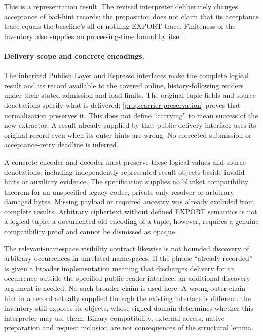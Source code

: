 This is a representation result. The revised interpreter deliberately
changes acceptance of bad-hint records; the proposition does not claim
that its acceptance trace equals the baseline's all-or-nothing EXPORT
trace. Finiteness of the inventory also supplies no processing-time
bound by itself.

\paragraph{Delivery scope and concrete encodings.}
The inherited Publish Layer and Espresso interfaces make the complete
logical result and its record available to the covered online,
history-following readers under their stated admission and load limits.
The original tuple fields and source denotations specify what is
delivered; \cref{prop:carrier-preservation} proves that normalization
preserves it. This does not define ``carrying'' to mean success of the
new extractor. A result already supplied by that public delivery
interface uses its original record even when its outer hints are
wrong. No corrected submission or acceptance-retry deadline is inferred.

A concrete encoder and decoder must preserve these logical values and
source denotations, including independently represented result objects
beside invalid hints or auxiliary evidence. The specification supplies
no blanket compatibility theorem for an unspecified legacy codec,
private-only resolver or arbitrary damaged bytes. Missing payload or
required ancestry was already excluded from complete results. Arbitrary
ciphertext without defined EXPORT semantics is not a logical tuple;
a documented old encoding of a tuple, however, requires a genuine
compatibility proof and cannot be dismissed as opaque.

The relevant-namespace visibility contract likewise is not bounded
discovery of arbitrary occurrences in unrelated namespaces. If the
phrase ``already recorded'' is given a broader implementation meaning
that discharges delivery for an occurrence outside the specified
public reader interface, an additional discovery argument is needed.
No such broader claim is used here. A wrong outer chain hint in a
record actually supplied through the existing interface is different:
the inventory still exposes its objects, whose signed domain determines
whether this interpreter may use them. Binary compatibility, external
access, native preparation and request inclusion are not consequences
of the structural lemma.
